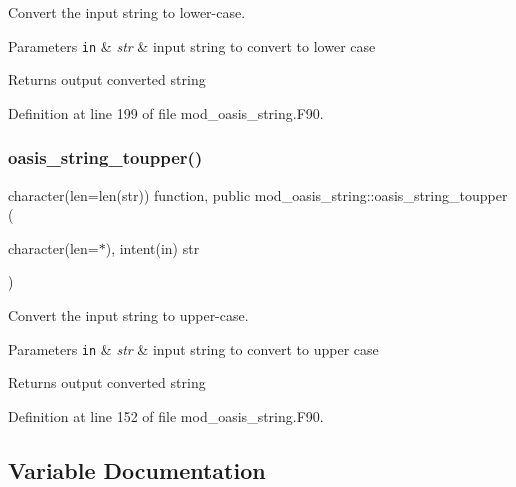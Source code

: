 Convert the input string to lower-\/case. 


\begin{DoxyParams}[1]{Parameters}
\mbox{\tt in}  & {\em str} & input string to convert to lower case\\
\hline
\end{DoxyParams}
\begin{DoxyReturn}{Returns}
output converted string 
\end{DoxyReturn}


Definition at line 199 of file mod\+\_\+oasis\+\_\+string.\+F90.

\mbox{\label{namespacemod__oasis__string_a832ff1d26d766bee361ef9669efacda6}} 
\subsubsection{\texorpdfstring{oasis\+\_\+string\+\_\+toupper()}{oasis\_string\_toupper()}}
{\footnotesize\ttfamily character(len=len(str)) function, public mod\+\_\+oasis\+\_\+string\+::oasis\+\_\+string\+\_\+toupper (\begin{DoxyParamCaption}\item[{character(len=$\ast$), intent(in)}]{str }\end{DoxyParamCaption})}



Convert the input string to upper-\/case. 


\begin{DoxyParams}[1]{Parameters}
\mbox{\tt in}  & {\em str} & input string to convert to upper case\\
\hline
\end{DoxyParams}
\begin{DoxyReturn}{Returns}
output converted string 
\end{DoxyReturn}


Definition at line 152 of file mod\+\_\+oasis\+\_\+string.\+F90.



\subsection{Variable Documentation}
\mbox{\label{namespacemod__oasis__string_a84408befb8bedabf75507eb4d690cea9}} 

